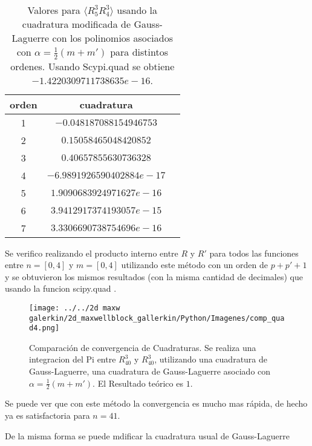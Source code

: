 			\begin{center}
				\begin{table}[h]
					\begin{tabular}{|c|c|c|}
						\hline
						orden  		& 	       cuadratura  \Ts \Bs         \\ \hline
						1	&        		$-0.048187088154946753$  					  \\ \hline
						2	&        		$0.15058465048420852$					  \\ \hline
						3	&        		$0.40657855630736328$					  \\ \hline
						4	&        		$-6.9891926590402884e-17$					  \\ \hline
						5	&        		$1.9090683924971627e-16$					  \\ \hline
						6	&        		$3.9412917374193057e-15$					  \\ \hline	
						7	&        		$3.3306690738754696e-16$		             \\ \hline 					  								  				  								  
					\end{tabular}
					\caption{Valores para $\langle R_5^3 R_4^3 \rangle$ usando la cuadratura modificada de Gauss-Laguerre con los polinomios asociados con $\alpha =\tfrac{1}{2}(m+m')$ para distintos ordenes. Usando Scypi.quad se obtiene $-1.4220309711738635e-16$. }
					\label{tab: cuad gen-lag-mod}
				\end{table}
			\end{center}
		
		Se verifico realizando el producto interno entre $R$ y $R'$ para todos las funciones entre $n=[0,4]$ y $m=[0,4]$ utilizando este método con un orden de $p+p'+1$ y se obtuvieron los mismos resultados (con la misma cantidad de decimales) que usando la funcion scipy.quad .
		
		\begin{figure}[h]
			\texttt{[image: ../../2d maxw galerkin/2d\_maxwellblock\_gallerkin/Python/Imagenes/comp\_quad4.png]}
			\caption{Comparación de convergencia de  Cuadraturas. Se realiza una integracion del Pi entre $R_{40}^3$ y $R_{40}^3$, utilizando una cuadratura de Gauss-Laguerre, una cuadratura de Gauss-Laguerre asociado con $\alpha =\tfrac{1}{2}(m+m')$. El Resultado teórico es $1$. }
		\end{figure}
		
		Se puede ver que con este método la convergencia es mucho mas rápida, de hecho ya es satisfactoria para $n=41$.
		
		De la misma forma se puede mdificar la cuadratura usual de Gauss-Laguerre
		
